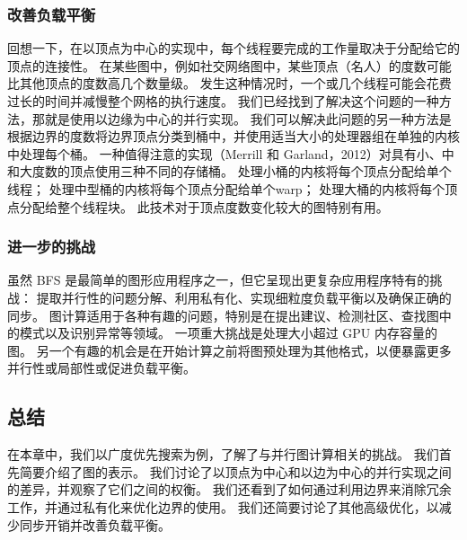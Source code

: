 \subsubsection{改善负载平衡}
回想一下，在以顶点为中心的实现中，每个线程要完成的工作量取决于分配给它的顶点的连接性。 
在某些图中，例如社交网络图中，某些顶点（名人）的度数可能比其他顶点的度数高几个数量级。 
发生这种情况时，一个或几个线程可能会花费过长的时间并减慢整个网格的执行速度。 
我们已经找到了解决这个问题的一种方法，那就是使用以边缘为中心的并行实现。 
我们可以解决此问题的另一种方法是根据边界的度数将边界顶点分类到桶中，并使用适当大小的处理器组在单独的内核中处理每个桶。 
一种值得注意的实现（Merrill 和 Garland，2012）对具有小、中和大度数的顶点使用三种不同的存储桶。 
处理小桶的内核将每个顶点分配给单个线程； 处理中型桶的内核将每个顶点分配给单个warp； 
处理大桶的内核将每个顶点分配给整个线程块。 此技术对于顶点度数变化较大的图特别有用。

\subsubsection{进一步的挑战}
虽然 BFS 是最简单的图形应用程序之一，但它呈现出更复杂应用程序特有的挑战：
提取并行性的问题分解、利用私有化、实现细粒度负载平衡以及确保正确的同步。 
图计算适用于各种有趣的问题，特别是在提出建议、检测社区、查找图中的模式以及识别异常等领域。 
一项重大挑战是处理大小超过 GPU 内存容量的图。 
另一个有趣的机会是在开始计算之前将图预处理为其他格式，以便暴露更多并行性或局部性或促进负载平衡。

\subsection{总结}
在本章中，我们以广度优先搜索为例，了解了与并行图计算相关的挑战。 我们首先简要介绍了图的表示。 
我们讨论了以顶点为中心和以边为中心的并行实现之间的差异，并观察了它们之间的权衡。 
我们还看到了如何通过利用边界来消除冗余工作，并通过私有化来优化边界的使用。 
我们还简要讨论了其他高级优化，以减少同步开销并改善负载平衡。